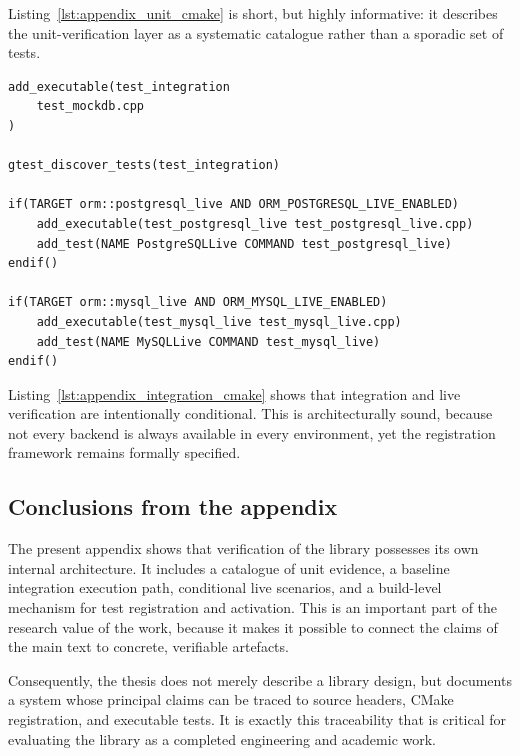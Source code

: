 Listing~\ref{lst:appendix_unit_cmake} is short, but highly informative: it describes the unit-verification layer as a systematic catalogue rather than a sporadic set of tests.

\begin{lstlisting}[caption={Excerpt from conditional live-test registration},label={lst:appendix_integration_cmake}]
add_executable(test_integration
    test_mockdb.cpp
)

gtest_discover_tests(test_integration)

if(TARGET orm::postgresql_live AND ORM_POSTGRESQL_LIVE_ENABLED)
    add_executable(test_postgresql_live test_postgresql_live.cpp)
    add_test(NAME PostgreSQLLive COMMAND test_postgresql_live)
endif()

if(TARGET orm::mysql_live AND ORM_MYSQL_LIVE_ENABLED)
    add_executable(test_mysql_live test_mysql_live.cpp)
    add_test(NAME MySQLLive COMMAND test_mysql_live)
endif()
\end{lstlisting}

Listing~\ref{lst:appendix_integration_cmake} shows that integration and live verification are intentionally conditional. This is architecturally sound, because not every backend is always available in every environment, yet the registration framework remains formally specified.

\subsection{Conclusions from the appendix}

The present appendix shows that verification of the library possesses its own internal architecture. It includes a catalogue of unit evidence, a baseline integration execution path, conditional live scenarios, and a build-level mechanism for test registration and activation. This is an important part of the research value of the work, because it makes it possible to connect the claims of the main text to concrete, verifiable artefacts.

Consequently, the thesis does not merely describe a library design, but documents a system whose principal claims can be traced to source headers, CMake registration, and executable tests. It is exactly this traceability that is critical for evaluating the \ORMName{} library as a completed engineering and academic work.
